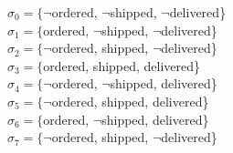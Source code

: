 \documentclass[a4paper]{article}
\begin{document}
\begin{center}
$\sigma_0 = \{${$\neg$ordered, $\neg$shipped, $\neg$delivered}\} \\[0.1\baselineskip]
$\sigma_1 = \{${ordered, $\neg$shipped, $\neg$delivered}\} \\[0.1\baselineskip]
$\sigma_2 = \{${$\neg$ordered, shipped, $\neg$delivered}\} \\[0.1\baselineskip]
$\sigma_3 = \{${ordered, shipped, delivered}\} \\[0.1\baselineskip]
$\sigma_4 = \{${$\neg$ordered, $\neg$shipped, delivered}\} \\[0.1\baselineskip]
$\sigma_5 = \{${$\neg$ordered, shipped, delivered}\} \\[0.1\baselineskip]
$\sigma_6 = \{${ordered, $\neg$shipped, delivered}\} \\[0.1\baselineskip]
$\sigma_7 = \{${$\neg$ordered, shipped, $\neg$delivered}\} \\[0.1\baselineskip]
\end{center}
\end{document}
